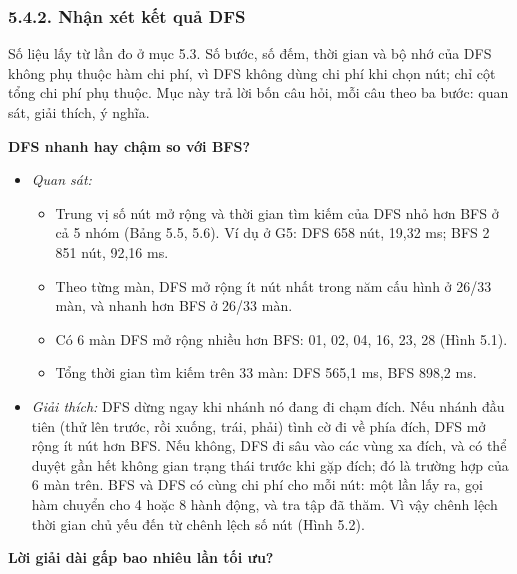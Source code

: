 \subsubsection{5.4.2. Nhận xét kết quả DFS}

Số liệu lấy từ lần đo ở mục 5.3. Số bước, số đếm, thời gian và bộ nhớ của DFS không phụ thuộc hàm chi phí, vì DFS không dùng chi phí khi chọn nút; chỉ cột tổng chi phí phụ thuộc. Mục này trả lời bốn câu hỏi, mỗi câu theo ba bước: quan sát, giải thích, ý nghĩa.

\textbf{DFS nhanh hay chậm so với BFS?}

\begin{itemize}
\tightlist
\item
  \emph{Quan sát:}

  \begin{itemize}
  \tightlist
  \item
    Trung vị số nút mở rộng và thời gian tìm kiếm của DFS nhỏ hơn BFS ở cả 5 nhóm (Bảng 5.5, 5.6). Ví dụ ở G5: DFS 658 nút, 19,32 ms; BFS 2 851 nút, 92,16 ms.
  \item
    Theo từng màn, DFS mở rộng ít nút nhất trong năm cấu hình ở 26/33 màn, và nhanh hơn BFS ở 26/33 màn.
  \item
    Có 6 màn DFS mở rộng nhiều hơn BFS: 01, 02, 04, 16, 23, 28 (Hình 5.1).
  \item
    Tổng thời gian tìm kiếm trên 33 màn: DFS 565,1 ms, BFS 898,2 ms.
  \end{itemize}
\item
  \emph{Giải thích:} DFS dừng ngay khi nhánh nó đang đi chạm đích. Nếu nhánh đầu tiên (thử lên trước, rồi xuống, trái, phải) tình cờ đi về phía đích, DFS mở rộng ít nút hơn BFS. Nếu không, DFS đi sâu vào các vùng xa đích, và có thể duyệt gần hết không gian trạng thái trước khi gặp đích; đó là trường hợp của 6 màn trên. BFS và DFS có cùng chi phí cho mỗi nút: một lần lấy ra, gọi hàm chuyển cho 4 hoặc 8 hành động, và tra tập đã thăm. Vì vậy chênh lệch thời gian chủ yếu đến từ chênh lệch số nút (Hình 5.2).
\end{itemize}

\textbf{Lời giải dài gấp bao nhiêu lần tối ưu?}

